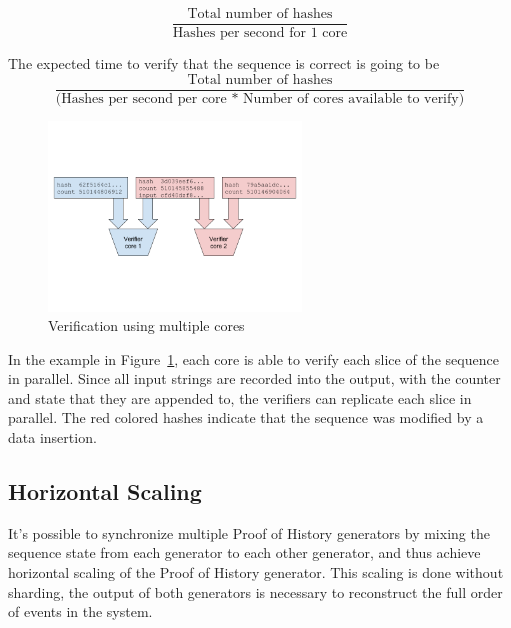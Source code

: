 \documentclass[12pt]{article}
\begin{document}
\[
\frac{\textrm{Total number of hashes}}{\textrm{Hashes per second for 1 core}}
\]

\noindent The expected time to verify that the sequence is correct is going to be \\

\[
\frac{\textrm{Total number of hashes}}{\textrm{(Hashes per second per core * Number of cores available to verify)}}
\]

\begin{figure}
  \begin{center}
    \centering
    \includegraphics[width=0.6\textwidth]{figures/fig_4.png}
    \caption[Figure 4]{Verification using multiple cores\label{fig:poh_verify}}
  \end{center}
  \end{figure}

In the example in Figure~\ref{fig:poh_verify}, each core is able to verify each slice of the sequence in parallel. Since all input strings are recorded into the output, with the counter and state that they are appended to, the verifiers can replicate each slice in parallel.  The red colored hashes indicate that the sequence was modified by a data insertion.

\subsection{Horizontal Scaling}\label{poh:scale}
It's possible to synchronize multiple Proof of History generators by mixing the sequence state from each generator to each other generator, and thus achieve horizontal scaling of the Proof of History generator.  This scaling is done without sharding, the output of both generators is necessary to reconstruct the full order of events in the system.
\end{document}
